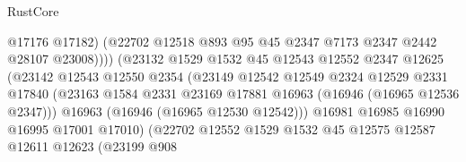 \begin{lexlean}{RustCore}
\begin{coremodule}
                                        @17176
                                        @17182)
                                      (@22702
                                        @12518
                                        @893
                                        @95
                                        @45
                                        @2347
                                        @7173
                                        @2347
                                        @2442
                                        @28107
                                        @23008))))
                                (@23132
                                  @1529
                                  @1532
                                  @45
                                  @12543
                                  @12552
                                  @2347
                                  @12625
                                  (@23142
                                    @12543
                                    @12550
                                    @2354
                                    (@23149
                                      @12542
                                      @12549
                                      @2324
                                      @12529
                                      @2331
                                      @17840
                                      (@23163
                                        @1584
                                        @2331
                                        @23169
                                        @17881
                                        @16963
                                        (@16946 (@16965 @12536 @2347)))
                                      @16963
                                      (@16946 (@16965 @12530 @12542)))
                                    @16981
                                    @16985
                                    @16990
                                    @16995
                                    @17001
                                    @17010)
                                  (@22702
                                    @12552
                                    @1529
                                    @1532
                                    @45
                                    @12575
                                    @12587
                                    @12611
                                    @12623
                                    (@23199
                                      @908

\end{coremodule}
\end{lexlean}
